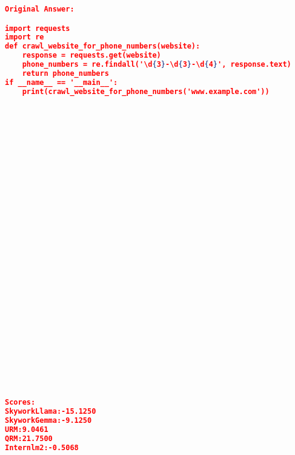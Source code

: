 \begin{lstlisting}[language=json,numbers=none]
Original Answer:

import requests
import re
def crawl_website_for_phone_numbers(website):
    response = requests.get(website)
    phone_numbers = re.findall('\d{3}-\d{3}-\d{4}', response.text)
    return phone_numbers
if __name__ == '__main__':
    print(crawl_website_for_phone_numbers('www.example.com'))





























    
Scores:
SkyworkLlama:-15.1250
SkyworkGemma:-9.1250
URM:9.0461
QRM:21.7500
Internlm2:-0.5068
\end{lstlisting}